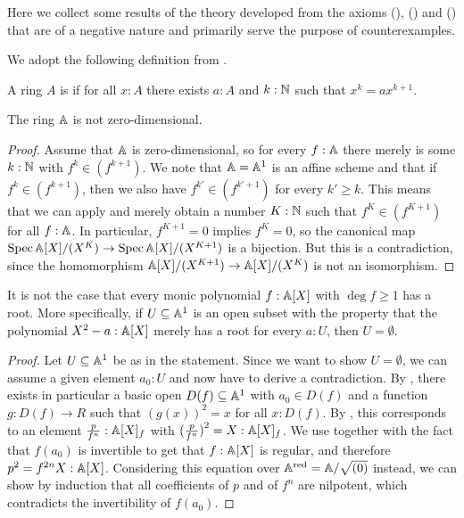 Here we collect some results of
the theory developed from the axioms
(), () and ()
that are of a negative nature
and primarily serve the purpose of counterexamples.

We adopt the following definition from
\cite[Section IV.8]{lombardi-quitte}.

\begin{definition}%
  \label{zero-dimensional-ring}
  A ring $A$ is 
  if for all $x : A$
  there exists $a : A$ and $k : \mathbb{N}$
  such that $x^k = a x^{k + 1}$.
\end{definition}

\begin{lemma}%
  \label{R-not-zero-dimensional}
  The ring $\mathbb{A}$ is not zero-dimensional.
\end{lemma}

\begin{proof}
  Assume that $\mathbb{A}$ is zero-dimensional,
  so for every $f : \mathbb{A}$ there merely is some $k : \mathbb{N}$ with $f^k \in (f^{k + 1})$.
  We note that $\mathbb{A} = \mathbb{A}^1$ is an affine scheme and
  that if $f^k \in (f^{k + 1})$,
  then we also have $f^{k'} \in (f^{k' + 1})$ for every $k' \geq k$.
  This means that we can apply 
  and merely obtain a number $K : \mathbb{N}$
  such that $f^K \in (f^{K + 1})$ for all $f : \mathbb{A}$.
  In particular, $f^{K + 1} = 0$ implies $f^K = 0$,
  so the canonical map
  $\operatorname{Spec} \mathbb{A}[X]/(X^K) \to \operatorname{Spec} \mathbb{A}[X]/(X^{K + 1})$
  is a bijection.
  But this is a contradiction,
  since the homomorphism $\mathbb{A}[X]/(X^{K + 1}) \to \mathbb{A}[X]/(X^K)$
  is not an isomorphism.
\end{proof}

\begin{example}%
  \label{non-existence-of-roots}
  It is not the case that
  every monic polynomial $f : \mathbb{A}[X]$ with $\deg f \geq 1$ has a root.
  More specifically,
  if $U \subseteq \mathbb{A}^1$ is an open subset
  with the property that
  the polynomial $X^2 - a : \mathbb{A}[X]$ merely has a root
  for every $a : U$,
  then $U = \emptyset$.
\end{example}

\begin{proof}
  Let $U \subseteq \mathbb{A}^1$ be as in the statement.
  Since we want to show $U = \emptyset$,
  we can assume a given element $a_0 : U$
  and now have to derive a contradiction.
  By ,
  there exists in particular a basic open $D(f) \subseteq \mathbb{A}^1$
  with $a_0 \in D(f)$
  and a function $g : D(f) \to R$
  such that ${(g(x))}^2 = x$ for all $x : D(f)$.
  By ,
  this corresponds to an element $\frac{p}{f^n} : \mathbb{A}[X]_f$
  with ${(\frac{p}{f^n})}^2 = X : \mathbb{A}[X]_f$.
  We use 
  together with the fact that $f(a_0)$ is invertible
  to get that $f : \mathbb{A}[X]$ is regular,
  and therefore $p^2 = f^{2n}X : \mathbb{A}[X]$.
  Considering this equation over $\mathbb{A}^{\mathrm{red}} = \mathbb{A}/\sqrt{(0)}$ instead,
  we can show by induction that all coefficients of $p$ and of $f^n$ are nilpotent,
  which contradicts the invertibility of $f(a_0)$.
\end{proof}

